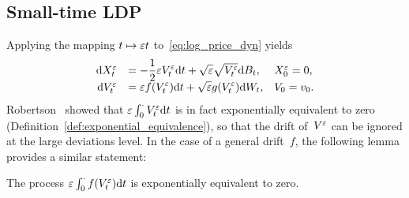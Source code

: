 \subsection{Small-time LDP}\label{sec:SmallTimeLDP}
Applying the mapping $t\mapsto \varepsilon t$ to~\eqref{eq:log_price_dyn} yields
\begin{equation}\label{eq:log_price_dynSmallTime}
\begin{array}{rll}
\mathrm{d} X_t^\varepsilon & = \displaystyle  -\frac{1}{2}\varepsilon V_t^\varepsilon \mathrm{d} t + \sqrt{\varepsilon}\sqrt{V_t^\varepsilon} \mathrm{d} B_t,
 & X_0^\varepsilon = 0,\\
\mathrm{d} V_t^\varepsilon & = \displaystyle \varepsilon f(V_t^\varepsilon)\mathrm{d} t + \sqrt{\varepsilon}g(V_t^\varepsilon) \mathrm{d} W_t, & V_0 = v_0.
\end{array}
\end{equation}
Robertson~\cite[Proposition~3.2]{Robertson2010SampleModels} showed that $\varepsilon\int_0^\cdot V_t^\varepsilon \mathrm{d} t$ is in fact exponentially equivalent to zero (Definition~\ref{def:exponential_equivalence}),
so that the drift of~$V^\varepsilon$ can be ignored at the large deviations level. 
In the case of a general drift~$f$, the following lemma provides a similar statement:
\begin{lemma}
The process $\varepsilon\int_0^\cdot f(V_t^\varepsilon) \mathrm{d} t$ is exponentially equivalent to zero.
\end{lemma}
